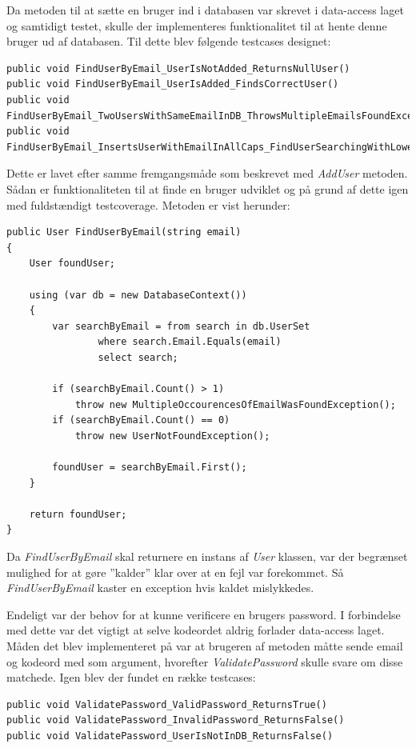 Da metoden til at sætte en bruger ind i databasen var skrevet i data-access laget og samtidigt testet, skulle der implementeres funktionalitet til at hente denne bruger ud af databasen. Til dette blev følgende testcases designet:

\begin{lstlisting}[caption=Testcases til \textit{FindUserByEmail} metoden.,label=code:finduserbyemailtestcases]
public void FindUserByEmail_UserIsNotAdded_ReturnsNullUser()
public void FindUserByEmail_UserIsAdded_FindsCorrectUser()
public void FindUserByEmail_TwoUsersWithSameEmailInDB_ThrowsMultipleEmailsFoundException()
public void FindUserByEmail_InsertsUserWithEmailInAllCaps_FindUserSearchingWithLowerCaps()
\end{lstlisting}

Dette er lavet efter samme fremgangsmåde som beskrevet med \textit{AddUser} metoden. Sådan er funktionaliteten til at finde en bruger udviklet og på grund af dette igen med fuldstændigt testcoverage. Metoden er vist herunder: 

\begin{lstlisting}[caption=FindUserByEmail metode]
public User FindUserByEmail(string email)
{
	User foundUser;
	
	using (var db = new DatabaseContext())
	{
		var searchByEmail = from search in db.UserSet
				where search.Email.Equals(email)
				select search;
	
		if (searchByEmail.Count() > 1) 
			throw new MultipleOccourencesOfEmailWasFoundException();
		if (searchByEmail.Count() == 0) 
			throw new UserNotFoundException();
	
		foundUser = searchByEmail.First();
	}
	
	return foundUser;
}
\end{lstlisting}

Da \textit{FindUserByEmail} skal returnere en instans af \textit{User} klassen, var der begrænset mulighed for at gøre ''kalder'' klar over at en fejl var forekommet. Så \textit{FindUserByEmail} kaster en exception hvis kaldet mislykkedes.

Endeligt var der behov for at kunne verificere en brugers password. I forbindelse med dette var det vigtigt at selve kodeordet aldrig forlader data-access laget. Måden det blev implementeret på var at brugeren af metoden måtte sende email og kodeord med som argument, hvorefter \textit{ValidatePassword} skulle svare om disse matchede. Igen blev der fundet en række testcases:

\begin{lstlisting}[caption=Testcases til \textit{ValidatePassword} metoden.,label=code:validatepasswordtestcases]
public void ValidatePassword_ValidPassword_ReturnsTrue()
public void ValidatePassword_InvalidPassword_ReturnsFalse()
public void ValidatePassword_UserIsNotInDB_ReturnsFalse()
\end{lstlisting}

